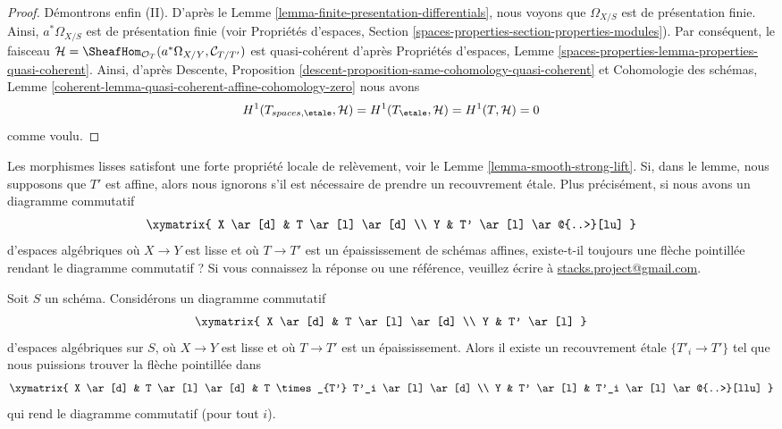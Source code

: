 \begin{proof}
\medskip\noindent
Démontrons enfin (II). D'après le
Lemme \ref{lemma-finite-presentation-differentials},
nous voyons que $\Omega_{X/S}$ est de présentation finie.
Ainsi, $a^*\Omega_{X/S}$ est de présentation finie (voir
Propriétés d'espaces,
Section \ref{spaces-properties-section-properties-modules}).
Par conséquent, le faisceau
$\mathcal{H} =
\SheafHom_{\mathcal{O}_T}(a^*\Omega_{X/Y}, \mathcal{C}_{T/T'})$
est quasi-cohérent d'après
Propriétés d'espaces,
Lemme \ref{spaces-properties-lemma-properties-quasi-coherent}.
Ainsi, d'après
Descente, Proposition \ref{descent-proposition-same-cohomology-quasi-coherent}
et Cohomologie des schémas, Lemme
\ref{coherent-lemma-quasi-coherent-affine-cohomology-zero}
nous avons
$$
H^1(T_{spaces, \etale}, \mathcal{H}) =
H^1(T_\etale, \mathcal{H}) =
H^1(T, \mathcal{H}) = 0
$$
comme voulu.
\end{proof}

\noindent
Les morphismes lisses satisfont une forte propriété locale de relèvement, voir le
Lemme \ref{lemma-smooth-strong-lift}. Si, dans le lemme, nous
supposons que $T'$ est affine, alors
nous ignorons s'il est nécessaire de prendre un recouvrement étale.
Plus précisément, si nous avons un diagramme commutatif
$$
\xymatrix{
X \ar[d] & T \ar[l] \ar[d] \\
Y & T' \ar[l] \ar@{..>}[lu]
}
$$
d'espaces algébriques où $X \to Y$ est lisse
et où $T \to T'$ est un épaississement de schémas affines,
existe-t-il toujours une flèche pointillée rendant le diagramme
commutatif ? Si vous connaissez la réponse ou une référence, veuillez écrire à
\href{mailto:stacks.project@gmail.com}{stacks.project@gmail.com}.

\begin{lemma}
\label{lemma-smooth-strong-lift}
Soit $S$ un schéma. Considérons un diagramme commutatif
$$
\xymatrix{
X \ar[d] & T \ar[l] \ar[d] \\
Y & T' \ar[l]
}
$$
d'espaces algébriques sur $S$, où $X \to Y$ est lisse
et où $T \to T'$ est un épaississement. Alors il existe un
recouvrement étale $\{T'_i \to T'\}$ tel que nous
puissions trouver la flèche pointillée dans
$$
\xymatrix{
X \ar[d] & T \ar[l] \ar[d] & T \times_{T'} T'_i \ar[l] \ar[d] \\
Y & T' \ar[l] & T'_i \ar[l] \ar@{..>}[llu]
}
$$
qui rend le diagramme commutatif (pour tout $i$).
\end{lemma}


